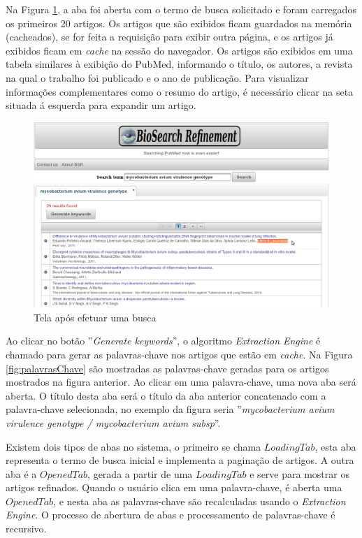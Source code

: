 Na Figura \ref{fig:telaComBusca}, a aba foi aberta com o termo de busca solicitado e foram carregados os primeiros 20 artigos. Os artigos que são exibidos ficam guardados na memória (cacheados), se for feita a requisição para exibir outra página, e os artigos já exibidos ficam em \emph{cache} na sessão do navegador. Os artigos são exibidos em uma tabela similares à exibição do PubMed, informando o título, os autores, a revista na qual o trabalho foi publicado e o ano de publicação. Para visualizar informações complementares como o resumo do artigo, é necessário clicar na seta situada á esquerda para expandir um artigo.
\begin{figure}[h!]
    \center
    \includegraphics[scale=0.35]{imagens/telaComBusca.png}
    \caption{Tela após efetuar uma busca \label{fig:telaComBusca}} 
\end{figure}

Ao clicar no botão ''\emph{Generate keywords}'', o algoritmo \emph{Extraction Engine} é chamado para gerar as palavras-chave nos artigos que estão em \emph{cache}. Na Figura \ref{fig:palavrasChave} são mostradas as palavras-chave geradas para os artigos mostrados na figura anterior. Ao clicar em uma palavra-chave, uma nova aba será aberta. O título desta aba será o título da aba anterior concatenado com a palavra-chave selecionada, no exemplo da figura seria ''\emph{mycobacterium avium virulence genotype / mycobacterium avium subsp}''.

Existem dois tipos de abas no sistema, o primeiro se chama $LoadingTab$, esta aba representa o termo de busca inicial e implementa a paginação de artigos. A outra aba é a $OpenedTab$, gerada a partir de uma $LoadingTab$ e serve para mostrar os artigos refinados. Quando o usuário clica em uma palavra-chave, é aberta uma $OpenedTab$, e nesta aba as palavras-chave são recalculadas usando o \emph{Extraction Engine}. O processo de abertura de abas e processamento de palavras-chave é recursivo. 

